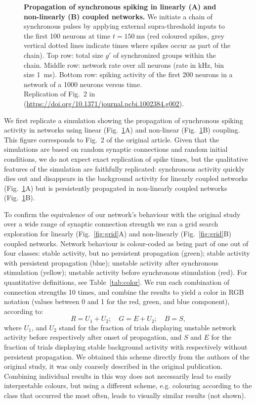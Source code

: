 \documentclass[10pt,a4paper,onecolumn]{article}
\begin{document}
\begin{figure}
\begin{subfigure}[t]{0.5\textwidth}
\end{subfigure}
\caption{\label{fig:raster}
\textbf{Propagation of synchronous spiking in linearly (A) and non-linearly (B) coupled networks.} We initiate a chain of synchronous pulses by applying external supra-threshold inputs to the first 100 neurons at time $t=\SI{150}{\milli\second}$ (red coloured spikes, grey vertical dotted lines indicate times where spikes occur as part of the chain). Top row: total size $g'$ of synchronized groups within the chain. Middle row: network rate over all neurons (rate in \si{\kilo\hertz}, bin size \SI{1}{\milli\second}). Bottom row: spiking activity of the first 200 neurons in a network of a 1000 neurons versus time.\\
Replication of Fig.~2 in \cite{Memmesheimer2012} (\url{https://doi.org/10.1371/journal.pcbi.1002384.g002}).}
\end{figure}

We first replicate a simulation showing the propagation of synchronous spiking activity in networks using linear (Fig.~\ref{fig:raster}A) and non-linear (Fig.~\ref{fig:raster}B) coupling. This figure corresponds to Fig.~2 of the original article. Given that the simulations are based on random synaptic connections and random initial conditions, we do not expect exact replication of spike times, but the qualitative features of the simulation are faithfully replicated: synchronous activity quickly dies out and disappears in the background activity for linearly coupled networks (Fig.~\ref{fig:raster}A) but is persistently propagated in non-linearly coupled networks (Fig.~\ref{fig:raster}B).

To confirm the equivalence of our network's behaviour with the original study over a wide range of synaptic connection strength we ran a grid search exploration for linearly (Fig.~\ref{fig:grid}A) and non-linearly (Fig.~\ref{fig:grid}B) coupled networks. Network behaviour is colour-coded as being part of one out of four classes: stable activity, but no persistent propagation (green); stable activity with persistent propagation (blue); unstable activity after synchronous stimulation (yellow); unstable activity before synchronous stimulation (red). For quantitative definitions, see Table~\ref{tab:color}. We run each combination of connection strengths 10 times, and combine the results to yield a color in RGB notation (values between 0 and 1 for the red, green, and blue component), according to:
\begin{equation}
R = U_1 + U_2;\quad G = E + U_2;\quad B = S,
\end{equation}
where $U_1$, and $U_2$ stand for the fraction of trials displaying unstable network activity before respectively after onset of propagation, and $S$ and $E$ for the fraction of trials displaying stable background activity with respectively without persistent propagation. We obtained this scheme directly from the authors of the original study, it was only coarsely described in the original publication. Combining individual results in this way does not necessarily lead to easily interpretable colours, but using a different scheme, e.g. colouring according to the class that occurred the most often, leads to visually similar results (not shown).
\end{document}
